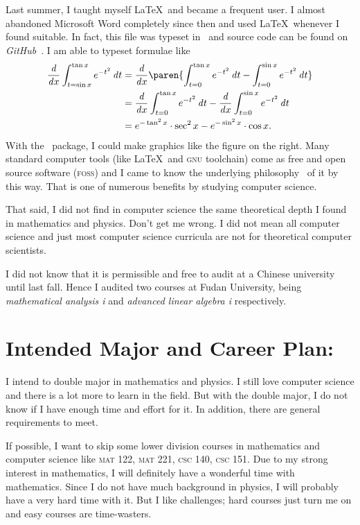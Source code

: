 	Last summer, I taught myself \LaTeX\ and became a frequent user. I almost
	abandoned Microsoft Word completely since then and used \LaTeX\ whenever I found
	suitable. In fact, this file was typeset in \LuaLaTeX\ and source code can be
	found on \textit{GitHub}~\cite{Readmission}. I am able to typeset formulae like
	\begin{align*}
	\dd x \int_{t=\sin x}^{\tan x} e^{-t^2} \dt
		&= \dd x \paren{\int_{t=0}^{\tan x} e^{-t^2} \dt -
			\int_{t=0}^{\sin x} e^{-t^2} \dt} \\
		&= \dd x \int_{t=0}^{\tan x} e^{-t^2} \dt
			- \dd x \int_{t=0}^{\sin x} e^{-t^2} \dt \\
		&= e^{-\tan^2 x} \cdot \sec^2 x - e^{-\sin^2 x} \cdot \cos x.
	\end{align*}
	With the \TikZ\ package, I could make graphics like the figure on the right.
	Many standard computer tools (like \LaTeX\ and \textsc{gnu} toolchain) come as
	free and open source software (\textsc{foss}) and I came to know the underlying
	philosophy~\cite{free-sw} of it by this way. That is one of numerous benefits
	by studying computer science.
	
	
	That said, I did not find in computer science the same theoretical depth I
	found in mathematics and physics. Don't get me wrong. I did not mean all
	computer science and just most computer science curricula are not for
	theoretical computer scientists.
	
	I did not know that it is permissible and free to audit at a Chinese university
	until last fall. Hence I audited two courses at Fudan University, being
	\textit{mathematical analysis \Rn{1}} and \textit{advanced linear algebra
		\Rn{1}} respectively.
	
	\section*{Intended Major and Career Plan:}
	I intend to double major in mathematics and physics. I still love computer
	science and there is a lot more to learn in the field. But with the double
	major, I do not know if I have enough time and effort for it. In addition,
	there are general requirements to meet.
	
	If possible, I want to skip some lower division courses in mathematics and
	computer science like \textsc{mat} 122, \textsc{mat} 221,
	\textsc{csc} 140, \textsc{csc} 151. Due to my strong interest in
	mathematics, I will definitely have a wonderful time with mathematics. Since I
	do not have much background in physics, I will probably have a very hard time
	with it. But I like challenges; hard courses just turn me on and easy courses
	are time-wasters.
	
